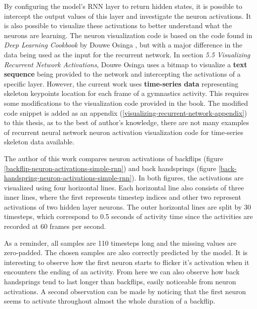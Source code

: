 By configuring the model's RNN layer to return hidden states, it is possible to intercept the output values of this layer and investigate the neuron activations. It is also possible to visualize these activations to better understand what the neurons are learning. The neuron visualization code is based on the code found in \textit{Deep Learning Cookbook} by Douwe Osinga \cite{deep-learning-cookbook}, but with a major difference in the data being used as the input for the recurrent network. In section \textit{5.5 Visualizing Recurrent Network Activations}, Douwe Osinga uses a bitmap to visualize a \textbf{text sequence} being provided to the network and intercepting the activations of a specific layer. However, the current work uses \textbf{time-series data} representing skeleton keypoints location for each frame of a gymnastics activity. This requires some modifications to the visualization code provided in the book. The modified code snippet is added as an appendix (\ref{visualizing-recurrent-network-appendix}) to this thesis, as to the best of author's knowledge, there are not many examples of recurrent neural network neuron activation visualization code for time-series skeleton data available.

The author of this work compares neuron activations of backflips (figure \ref{backflip-neuron-activations-simple-rnn}) and back handsprings (figure \ref{back-handspring-neuron-activations-simple-rnn}). In both figures, the activations are visualized using four horizontal lines. Each horizontal line also consists of three inner lines, where the first represents timestep indices and other two represent activations of two hidden layer neurons. The outer horizontal lines are split by 30 timesteps, which correspond to 0.5 seconds of activity time since the activities are recorded at 60 frames per second.

As a reminder, all samples are 110 timesteps long and the missing values are zero-padded. The chosen samples are also correctly predicted by the model. It is interesting to observe how the first neuron starts to flicker it's activation when it encounters the ending of an activity. From here we can also observe how back handsprings tend to last longer than backflips, easily noticeable from neuron activations. A second observation can be made by noticing that the first neuron seems to activate throughout almost the whole duration of a backflip. 

